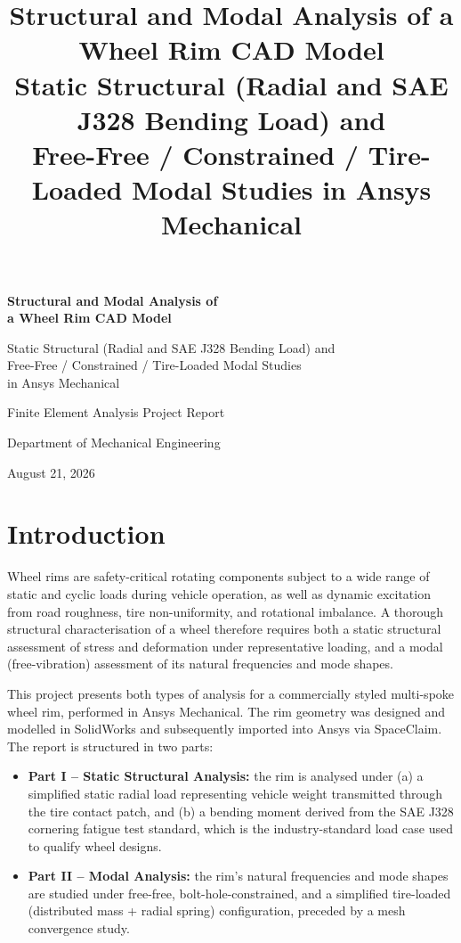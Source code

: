 \documentclass[11pt]{article}
\title{\textbf{Structural and Modal Analysis of a Wheel Rim CAD Model} \\[0.3em]
\large Static Structural (Radial and SAE J328 Bending Load) and \\
Free-Free / Constrained / Tire-Loaded Modal Studies in Ansys Mechanical}
\author{}
\date{}
\begin{document}
\begin{titlepage}
\centering
\vspace*{3cm}
{\Huge\bfseries Structural and Modal Analysis of\\[0.3em] a Wheel Rim CAD Model\par}
\vspace{1cm}
{\Large Static Structural (Radial and SAE J328 Bending Load) and\\
Free-Free / Constrained / Tire-Loaded Modal Studies\\ in Ansys Mechanical\par}
\vspace{2cm}
{\large Finite Element Analysis Project Report\par}
\vspace{0.5cm}
{\large Department of Mechanical Engineering\par}
\vfill
{\large August 21, 2026\par}
\end{titlepage}

\tableofcontents
\newpage

\section{Introduction}

Wheel rims are safety-critical rotating components subject to a wide range of static and
cyclic loads during vehicle operation, as well as dynamic excitation from road roughness,
tire non-uniformity, and rotational imbalance. A thorough structural characterisation of
a wheel therefore requires both a static structural assessment of stress and deformation
under representative loading, and a modal (free-vibration) assessment of its natural
frequencies and mode shapes.

This project presents both types of analysis for a commercially styled multi-spoke wheel
rim, performed in Ansys Mechanical. The rim geometry was designed and modelled in
SolidWorks and subsequently imported into Ansys via SpaceClaim. The report is structured
in two parts:

\begin{itemize}
    \item \textbf{Part I -- Static Structural Analysis:} the rim is analysed under (a) a
    simplified static radial load representing vehicle weight transmitted through the tire
    contact patch, and (b) a bending moment derived from the SAE J328 cornering fatigue
    test standard, which is the industry-standard load case used to qualify wheel designs.
    \item \textbf{Part II -- Modal Analysis:} the rim's natural frequencies and mode
    shapes are studied under free-free, bolt-hole-constrained, and a simplified
    tire-loaded (distributed mass + radial spring) configuration, preceded by a mesh
    convergence study.
\end{itemize}
\end{document}

